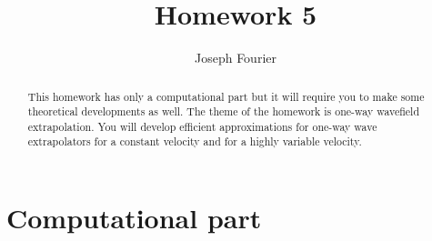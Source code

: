 \author{Joseph Fourier} 
\title{Homework 5}

\begin{abstract}
  This homework has only a computational part but it will require you
  to make some theoretical developments as well.  The theme of the
  homework is one-way wavefield extrapolation. You will develop
  efficient approximations for one-way wave extrapolators for a
  constant velocity and for a highly variable velocity.
\end{abstract}

\section{Computational part}

\lstset{language=python,numbers=left,numberstyle=\tiny,showstringspaces=false}

